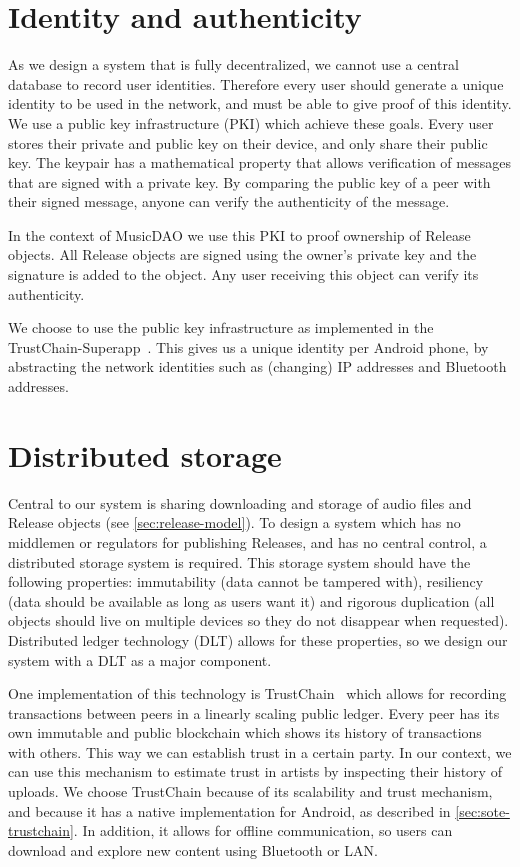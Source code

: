 \section{Identity and authenticity}
\label{sec:pki-design}
As we design a system that is fully decentralized, we cannot use a central database to record user identities. Therefore every user should generate a unique identity to be used in the network, and must be able to give proof of this identity. We use a public key infrastructure (PKI) which achieve these goals. Every user stores their private and public key on their device, and only share their public key. The keypair has a mathematical property that allows verification of messages that are signed with a private key. By comparing the public key of a peer with their signed message, anyone can verify the authenticity of the message.

In the context of MusicDAO we use this PKI to proof ownership of Release objects. All Release objects are signed using the owner's private key and the signature is added to the object. Any user receiving this object can verify its authenticity.

We choose to use the public key infrastructure as implemented in the TrustChain-Superapp~\citep{mattskala2020}. This gives us a unique identity per Android phone, by abstracting the network identities such as (changing) IP addresses and Bluetooth addresses.  
\section{Distributed storage}
Central to our system is sharing downloading and storage of audio files and Release objects (see \ref{sec:release-model}). To design a system which has no middlemen or regulators for publishing Releases, and has no central control, a distributed storage system is required. This storage system should have the following properties: immutability (data cannot be tampered with), resiliency (data should be available as long as users want it) and rigorous duplication (all objects should live on multiple devices so they do not disappear when requested). Distributed ledger technology (DLT) allows for these properties, so we design our system with a DLT as a major component.

One implementation of this technology is TrustChain~\citep{otte2020trustchain} which allows for recording transactions between peers in a linearly scaling public ledger. Every peer has its own immutable and public blockchain which shows its history of transactions with others. This way we can establish trust in a certain party. In our context, we can use this mechanism to estimate trust in artists by inspecting their history of uploads. We choose TrustChain because of its scalability and trust mechanism, and because it has a native implementation for Android, as described in \ref{sec:sote-trustchain}. In addition, it allows for offline communication, so users can download and explore new content using Bluetooth or LAN.

